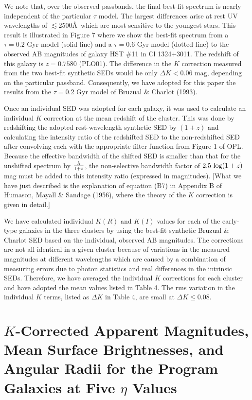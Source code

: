 \documentclass[preprint]{aastex}
\begin{document}
We note that, over the observed passbands, the final best-fit spectrum
is nearly independent of the particular $\tau$ model. The largest
differences arise at rest UV wavelengths of $\lesssim 2500$\AA\ which
are most sensitive to the youngest stars. This result is illustrated
in Figure 7 where we show the best-fit spectrum from a $\tau = 0.2$
Gyr model (solid line) and a $\tau = 0.6$ Gyr model (dotted line) to
the observed AB magnitudes of galaxy HST \#11 in Cl 1324+3011. The
redshift of this galaxy is $z = 0.7580$ (PLO01).  The difference in
the $K$ correction measured from the two best-fit synthetic SEDs would
be only $\Delta K < 0.06$ mag, depending on the particular passband.
Consequently, we have adopted for this paper the results from the
$\tau = 0.2$ Gyr model of Bruzual \& Charlot (1993).

Once an individual SED was adopted for each galaxy, it was used to
calculate an individual $K$ correction at the mean redshift of the
cluster. This was done by redshifting the adopted rest-wavelength
synthetic SED by $(1 + z)$ and calculating the intensity ratio of the
redshifted SED to the non-redshifted SED after convolving each with
the appropriate filter function from Figure 1 of OPL.  Because the
effective bandwidth of the shifted SED is smaller than that for the
unshifted spectrum by $\lambda \over{1 + z}$, the non-selective
bandwidth factor of $2.5~{\rm log}(1 + z)$ mag must be added to this
intensity ratio (expressed in magnitudes). [What we have just
described is the explanation of equation (B7) in Appendix B of
Humason, Mayall \& Sandage (1956), where the theory of the $K$
correction is given in detail.]

We have calculated individual $K(R)$ and $K(I)$ values for each of the
early-type galaxies in the three clusters by using the best-fit
synthetic Bruzual \& Charlot SED based on the individual, observed AB
magnitudes. The corrections are not all identical in a given cluster
because of variations in the measured magnitudes at different
wavelengths which are caused by a combination of measuring errors due
to photon statistics and real differences in the intrinsic
SEDs. Therefore, we have averaged the individual $K$ corrections for
each cluster and have adopted the mean values listed in Table 4. The
rms variation in the individual $K$ terms, listed as $\Delta K$ in
Table 4, are small at $\Delta K \le 0.08$.

\section{$K$-Corrected Apparent Magnitudes, Mean Surface Brightnesses,
and Angular Radii for the Program Galaxies at Five $\eta$ Values}
\end{document}
